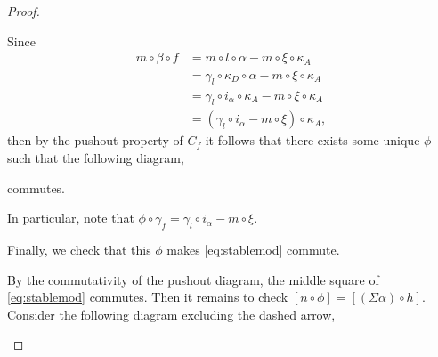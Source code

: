 \begin{proof}
\begin{enumerate}[label={(\bfseries TR\arabic*)}]
{            Since
            \begin{align*}
                m \circ \beta \circ f &= m \circ l \circ \alpha - m \circ \xi \circ \kappa_A \\
                &= \gamma_{l} \circ \kappa_{D} \circ \alpha - m \circ \xi \circ \kappa_A \\
                &= \gamma_{l} \circ i_{\alpha} \circ \kappa_A - m \circ \xi \circ \kappa_A \\
                &= (\gamma_{l} \circ i_{\alpha} - m \circ \xi) \circ \kappa_A,
            \end{align*}
            then by the pushout property of \( C_f \) it follows that there exists some unique \( \phi \) such that the following diagram,
            \begin{center}
            \end{center}
            commutes.

            In particular, note that \( \phi \circ \gamma_f = \gamma_{l} \circ i_{\alpha} - m \circ \xi \).

            Finally, we check that this \( \phi \) makes \autoref{eq:stablemod} commute.

            By the commutativity of the pushout diagram, the middle square of \autoref{eq:stablemod} commutes. Then it remains to check \( [n \circ \phi] = [(\Sigma \alpha) \circ h] \). Consider the following diagram excluding the dashed arrow,
            \begin{center}
\end{center}}
\end{enumerate}
\end{proof}
